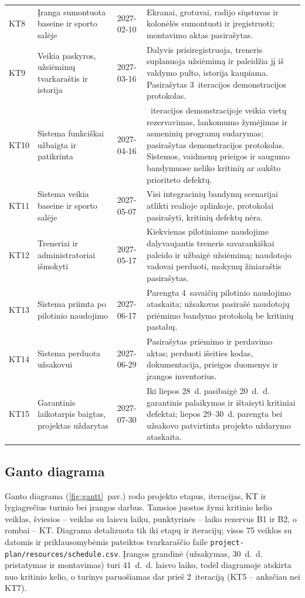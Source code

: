 \begin{table}[H]
\begin{tabularx}{\textwidth}{@{}l>{\raggedright\arraybackslash}p{}l>{\raggedright\arraybackslash}X@{}}
    KT8 & Įranga sumontuota baseine ir sporto salėje & 2027-02-10 & Ekranai, grotuvai, radijo siųstuvas ir kolonėlės sumontuoti ir įregistruoti; montavimo aktas pasirašytas. \\
    KT9 & Veikia paskyros, užsiėmimų tvarkaraštis ir istorija & 2027-03-16 & Dalyvis prisiregistruoja, treneris suplanuoja užsiėmimą ir paleidžia jį iš valdymo pulto, istorija kaupiama. Pasirašytas 3~iteracijos demonstracijos protokolas. \\
    KT10 & Sistema funkciškai užbaigta ir patikrinta & 2027-04-16 & 4~iteracijos demonstracijoje veikia vietų rezervavimas, lankomumo žymėjimas ir asmeninių programų sudarymas; pasirašytas demonstracijos protokolas. Sistemos, vaidmenų prieigos ir saugumo bandymuose neliko kritinių ar aukšto prioriteto defektų. \\
    KT11 & Sistema veikia baseine ir sporto salėje & 2027-05-07 & Visi integracinių bandymų scenarijai atlikti realioje aplinkoje, protokolai pasirašyti, kritinių defektų nėra. \\
    KT12 & Treneriai ir administratoriai išmokyti & 2027-05-17 & Kiekvienas pilotiniame naudojime dalyvaujantis treneris savarankiškai paleido ir užbaigė užsiėmimą; naudotojo vadovai perduoti, mokymų žiniaraštis pasirašytas. \\
    KT13 & Sistema priimta po pilotinio naudojimo & 2027-06-17 & Parengta 4~savaičių pilotinio naudojimo ataskaita; užsakovas pasirašė naudotojų priėmimo bandymo protokolą be kritinių pastabų. \\
    KT14 & Sistema perduota užsakovui & 2027-06-29 & Pasirašytas priėmimo ir perdavimo aktas; perduoti išeities kodas, dokumentacija, prieigos duomenys ir įrangos inventorius. \\
    KT15 & Garantinis laikotarpis baigtas, projektas uždarytas & 2027-07-30 & Iki liepos 28~d. pasibaigė 20~d.~d. garantinis palaikymas ir ištaisyti kritiniai defektai; liepos 29--30~d. parengta bei užsakovo patvirtinta projekto uždarymo ataskaita. \\
    \bottomrule
  \end{tabularx}
\end{table}

\subsection{Ganto diagrama}

Ganto diagrama (\ref{fig:gantt}~pav.) rodo projekto etapus, iteracijas, KT
ir lygiagrečius turinio bei įrangos darbus. Tamsios juostos žymi kritinio
kelio veiklas, šviesios – veiklas su laisvu laiku, punktyrinės – laiko
rezervus B1 ir B2, o rombai – KT. Diagrama detalizuota tik iki etapų ir iteracijų;
visos 75 veiklos su datomis ir priklausomybėmis pateiktos tvarkaraščio
faile \texttt{project-plan/\allowbreak resources/\allowbreak schedule.csv}. Įrangos grandinė (užsakymas, 30~d.~d.
pristatymas ir montavimas) turi 41~d.~d. laisvo laiko, todėl diagramoje
atskirta nuo kritinio kelio, o turinys paruošiamas dar prieš 2~iteraciją
(KT5 – anksčiau nei KT7).

